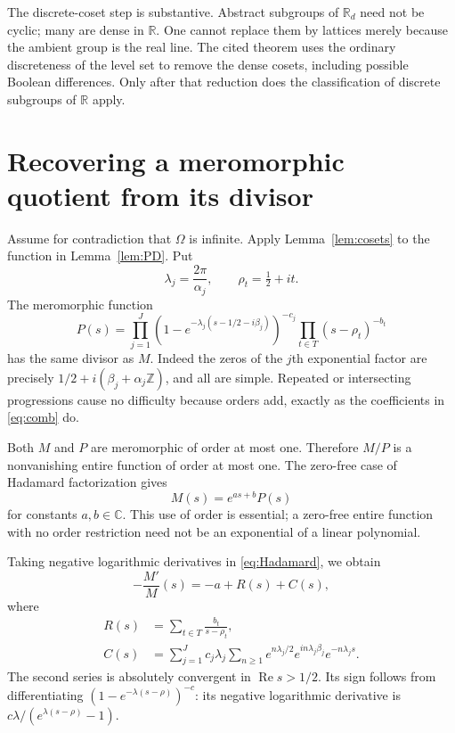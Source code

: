 \documentclass[11pt]{article}
\theoremstyle{definition}
\theoremstyle{remark}
\newcommand{\R}{\mathbb R}
\newcommand{\C}{\mathbb C}
\newcommand{\Z}{\mathbb Z}
\newcommand{\Rea}{\operatorname{Re}}
\numberwithin{equation}{section}
\begin{document}
The discrete-coset step is substantive. Abstract subgroups of $\R_d$ need not be cyclic; many are dense in $\R$. One cannot replace them by lattices merely because the ambient group is the real line. The cited theorem uses the ordinary discreteness of the level set to remove the dense cosets, including possible Boolean differences. Only after that reduction does the classification of discrete subgroups of $\R$ apply.

\section{Recovering a meromorphic quotient from its divisor}

Assume for contradiction that $\Omega$ is infinite. Apply Lemma~\ref{lem:cosets} to the function in Lemma~\ref{lem:PD}. Put
\[
\lambda_j=\frac{2\pi}{\alpha_j},\qquad \rho_t=\tfrac12+it.
\]
The meromorphic function
\begin{equation}\label{eq:P}
P(s)=\prod_{j=1}^J
\left(1-e^{-\lambda_j(s-1/2-i\beta_j)}\right)^{-c_j}
\prod_{t\in T}(s-\rho_t)^{-b_t}
\end{equation}
has the same divisor as $M$. Indeed the zeros of the $j$th exponential factor are precisely $1/2+i(\beta_j+\alpha_j\Z)$, and all are simple. Repeated or intersecting progressions cause no difficulty because orders add, exactly as the coefficients in \eqref{eq:comb} do.

Both $M$ and $P$ are meromorphic of order at most one. Therefore $M/P$ is a nonvanishing entire function of order at most one. The zero-free case of Hadamard factorization gives
\begin{equation}\label{eq:Hadamard}
M(s)=e^{as+b}P(s)
\end{equation}
for constants $a,b\in\C$. This use of order is essential; a zero-free entire function with no order restriction need not be an exponential of a linear polynomial.

Taking negative logarithmic derivatives in \eqref{eq:Hadamard}, we obtain
\begin{equation}\label{eq:modelD}
-\frac{M'}M(s)=-a+R(s)+C(s),
\end{equation}
where
\begin{align}
R(s)&=\sum_{t\in T}\frac{b_t}{s-\rho_t},\label{eq:R}\\
C(s)&=\sum_{j=1}^Jc_j\lambda_j
\sum_{n\ge1}e^{n\lambda_j/2}e^{in\lambda_j\beta_j}e^{-n\lambda_js}.
\label{eq:C}
\end{align}
The second series is absolutely convergent in $\Rea s>1/2$. Its sign follows from differentiating $(1-e^{-\lambda(s-\rho)})^{-c}$: its negative logarithmic derivative is $c\lambda/(e^{\lambda(s-\rho)}-1)$.
\end{document}

